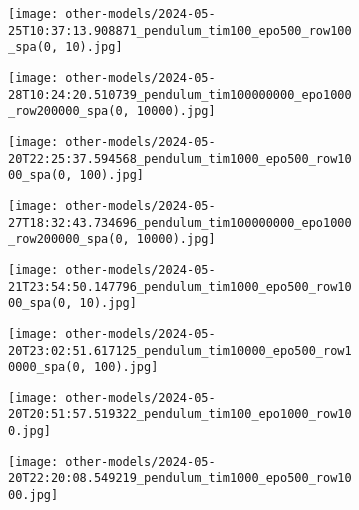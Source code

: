 \begin{figure}[H]
    \centering
    \begin{subfigure}{.47\linewidth}
        \centering
        \texttt{[image: other-models/2024-05-25T10:37:13.908871\_pendulum\_tim100\_epo500\_row100\_spa(0, 10).jpg]}
    \end{subfigure}
    \begin{subfigure}{.47\linewidth}
        \centering
        \texttt{[image: other-models/2024-05-28T10:24:20.510739\_pendulum\_tim100000000\_epo1000\_row200000\_spa(0, 10000).jpg]}
    \end{subfigure}
    \begin{subfigure}{.47\linewidth}
        \centering
        \texttt{[image: other-models/2024-05-20T22:25:37.594568\_pendulum\_tim1000\_epo500\_row1000\_spa(0, 100).jpg]}
    \end{subfigure}
    \begin{subfigure}{.47\linewidth}
        \centering
        \texttt{[image: other-models/2024-05-27T18:32:43.734696\_pendulum\_tim100000000\_epo1000\_row200000\_spa(0, 10000).jpg]}
    \end{subfigure}
\end{figure}
\begin{figure}[H]
    \centering
    \begin{subfigure}{.47\linewidth}
        \centering
        \texttt{[image: other-models/2024-05-21T23:54:50.147796\_pendulum\_tim1000\_epo500\_row1000\_spa(0, 10).jpg]}
    \end{subfigure}
    \begin{subfigure}{.47\linewidth}
        \centering
        \texttt{[image: other-models/2024-05-20T23:02:51.617125\_pendulum\_tim10000\_epo500\_row10000\_spa(0, 100).jpg]}
    \end{subfigure}
    \begin{subfigure}{.47\linewidth}
        \centering
        \texttt{[image: other-models/2024-05-20T20:51:57.519322\_pendulum\_tim100\_epo1000\_row100.jpg]}
    \end{subfigure}
    \begin{subfigure}{.47\linewidth}
        \centering
        \texttt{[image: other-models/2024-05-20T22:20:08.549219\_pendulum\_tim1000\_epo500\_row1000.jpg]}
    \end{subfigure}
\end{figure}
